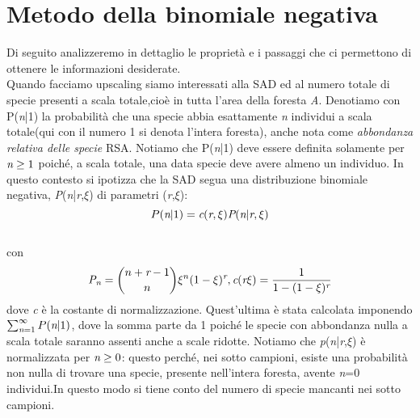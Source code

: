 \section{Metodo della binomiale negativa}
Di seguito analizzeremo in dettaglio le proprietà e i passaggi che ci permettono di ottenere le informazioni desiderate.\\
Quando facciamo upscaling siamo interessati alla SAD ed al numero totale di specie presenti a scala totale,cioè in tutta l'area della foresta \emph{A}.
Denotiamo con P(\emph{n}|1) la probabilità che una specie abbia esattamente \emph{n} individui a scala totale(qui con il numero 1 si denota l'intera foresta), anche nota come \emph{abbondanza relativa delle specie} RSA.
Notiamo che P(\emph{n}|1) deve essere definita solamente per $\emph{n}\ge1$ poiché, a scala totale, una data specie deve avere almeno un individuo.
In questo contesto si ipotizza che la SAD segua una distribuzione binomiale negativa, \emph{P}(\emph{n}|\emph{r},$\xi$) di parametri (\emph{r},$\xi$):
\begin{equation}
 P(\emph{n}|1)=\emph{c}(\emph{r},\xi)\emph{P}(\emph{n}|\emph{r},\xi)
 \label{eq:NBfunctform}
\end{equation}
\\
con 
\begin{equation}
    \emph{P}_\emph{n}=\binom{n+\emph{r}-1}{n}\xi^n(1-\xi)^{\emph{r}},      
    \emph{c}(\emph{r}\xi)=\frac{1}{1-(1-\xi)^{\emph{r}}}
\end{equation}
dove \emph{c} è la costante di normalizzazione.
Quest'ultima è stata calcolata imponendo $\sum_{\emph{n}=1}^\infty P(\emph{n}|1)$, dove la somma parte da 1 poiché le specie con abbondanza nulla a scala totale saranno assenti anche a scale ridotte.
Notiamo che \emph{p}(\emph{n}|\emph{r},$\xi$) è normalizzata per $\emph{n}\ge0$: questo perché, nei sotto campioni, esiste una probabilità non nulla di trovare una specie, presente nell'intera foresta, avente \emph{n}=0 individui.In questo modo si tiene conto del numero di specie mancanti nei sotto campioni.\\

